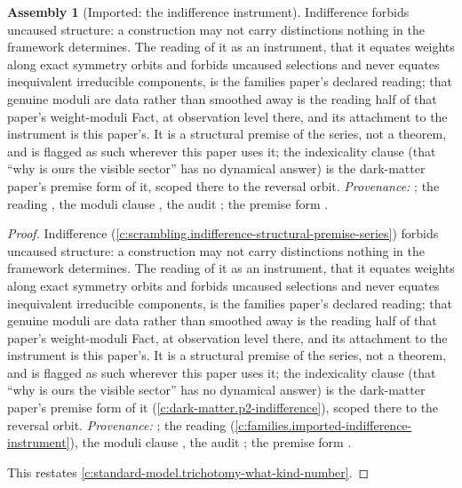 \documentclass[11pt]{article}
\theoremstyle{definition}
\newtheorem{assembled}[theorem]{Assembly}
\theoremstyle{plain}
\newcommand{\changedmark}[2]{\marginpar{\raggedright\scriptsize\color{#1}#2}}
\begin{document}
\begin{assembled}[Imported: the indifference instrument]\label{c:one-relation.imported-indifference-instrument}
\changedmark{gray}{reworded}
Indifference forbids uncaused structure: a construction may not carry distinctions nothing in the framework determines. The reading of it as an instrument, that it equates weights along exact symmetry orbits and forbids uncaused selections and never equates inequivalent irreducible components, is the families paper's declared reading; that genuine moduli are data rather than smoothed away is the reading half of that paper's weight-moduli Fact, at observation level there, and its attachment to the instrument is this paper's. It is a structural premise of the series, not a theorem, and is flagged as such wherever this paper uses it; the indexicality clause (that ``why is ours the visible sector'' has no dynamical answer) is the dark-matter paper's premise form of it, scoped there to the reversal orbit. \emph{Provenance:} \cite[Principle~5.4]{ButlerT8}; the reading \cite[Fact~2.5]{ButlerT13}, the moduli clause \cite[Fact~2.4]{ButlerT13}, the audit \cite[\S5]{ButlerT13}; the premise form \cite[Premise~2.2]{ButlerT14}.
\end{assembled}
\begin{proof}
Indifference (\ref{c:scrambling.indifference-structural-premise-series}) forbids uncaused structure: a construction may not carry distinctions nothing in the framework determines. The reading of it as an instrument, that it equates weights along exact symmetry orbits and forbids uncaused selections and never equates inequivalent irreducible components, is the families paper's declared reading; that genuine moduli are data rather than smoothed away is the reading half of that paper's weight-moduli Fact, at observation level there, and its attachment to the instrument is this paper's. It is a structural premise of the series, not a theorem, and is flagged as such wherever this paper uses it; the indexicality clause (that ``why is ours the visible sector'' has no dynamical answer) is the dark-matter paper's premise form of it (\ref{c:dark-matter.p2-indifference}), scoped there to the reversal orbit. \emph{Provenance:} \cite[Principle~5.4]{ButlerT8}; the reading \cite[Fact~2.5]{ButlerT13} (\ref{c:families.imported-indifference-instrument}), the moduli clause \cite[Fact~2.4]{ButlerT13}, the audit \cite[\S5]{ButlerT13}; the premise form \cite[Premise~2.2]{ButlerT14}.

This restates \ref{c:standard-model.trichotomy-what-kind-number}.

\end{proof}
\end{document}
